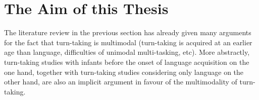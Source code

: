 \section{The Aim of this Thesis}
\label{sec:introductionaim}
The literature review in the previous section has already given many arguments for the fact that turn-taking is multimodal (turn-taking is acquired at an earlier age than language, difficulties of unimodal multi-tasking, etc). %
More abstractly, turn-taking studies with infants before the onset of language acquisition on the one hand, together with turn-taking studies considering only language on the other hand, are also an implicit argument in favour of the multimodality of turn-taking. %






















